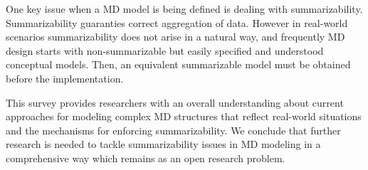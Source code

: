 One key issue when a MD model is being defined is dealing with
summarizability. Summarizability guaranties correct aggregation of
data. However in real-world scenarios summarizability does not arise
in a natural way, and frequently MD design starts with
non-summarizable but easily specified and understood conceptual
models. Then, an equivalent summarizable model must be obtained
before the implementation.

This survey provides researchers with an overall understanding about
current approaches for modeling complex MD structures that reflect
real-world situations and the mechanisms for enforcing
summarizability.  We conclude that further research is needed to
tackle summarizability issues in MD modeling in a comprehensive way
which remains as an open research problem.


%





%
